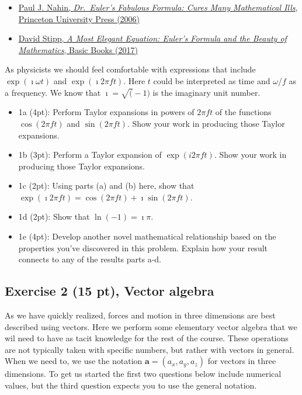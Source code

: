 \documentclass[11pt]{article}
\providecommand{\tightlist}{%
      \setlength{\itemsep}{0pt}\setlength{\parskip}{0pt}}
\begin{document}
\begin{itemize}
\tightlist
\item
  \href{https://bookshop.org/p/books/dr-euler-s-fabulous-formula-cures-many-mathematical-ills-paul-j-nahin/9008263}{Paul
  J. Nahin, \emph{Dr.~Euler's Fabulous Formula: Cures Many Mathematical
  Ills}, Princeton University Press (2006)}
\item
  \href{https://bookshop.org/p/books/a-most-elegant-equation-euler-s-formula-and-the-beauty-of-mathematics-david-stipp/11457298}{David
  Stipp, \emph{A Most Elegant Equation: Euler's Formula and the Beauty
  of Mathematics}, Basic Books (2017)}
\end{itemize}

As physicists we should feel comfortable with expressions that include
\(\exp{(\imath \omega t)}\) and \(\exp{(\imath 2\pi f t)}\). Here \(t\)
could be interpreted as time and \(\omega\)/\(f\) as a frequency. We
know that \(\imath = \sqrt(-1)\) is the imaginary unit number.

\begin{itemize}
\tightlist
\item
  1a (4pt): Perform Taylor expansions in powers of \(2\pi f t\) of the
  functions \(\cos{(2\pi f t)}\) and \(\sin{(2\pi f t)}\). Show your
  work in producing those Taylor expansions.
\item
  1b (3pt): Perform a Taylor expansion of \(\exp{(i2\pi f t)}\). Show
  your work in producing those Taylor expansions.
\item
  1c (2pt): Using parts (a) and (b) here, show that
  \(\exp{(\imath2\pi f t)}=\cos{(2\pi f t)}+\imath\sin{(2\pi f t)}\).
\item
  1d (2pt): Show that \(\ln{(-1)} = \imath\pi\).
\item
  1e (4pt): Develop another novel mathematical relationship based on the
  properties you've discovered in this problem. Explain how your result
  connects to any of the results parts a-d.
\end{itemize}

    \subsection{Exercise 2 (15 pt), Vector
algebra}\label{exercise-2-15-pt-vector-algebra}

As we have quickly realized, forces and motion in three dimensions are
best described using vectors. Here we perform some elementary vector
algebra that we wil need to have as tacit knowledge for the rest of the
course. These operations are not typically taken with specific numbers,
but rather with vectors in general. When we need to, we use the notation
\(\boldsymbol{a}=(a_x,a_y,a_z)\) for vectors in three dimensions. To get
us started the first two questions below include numerical values, but
the third question expects you to use the general notation.
\end{document}
